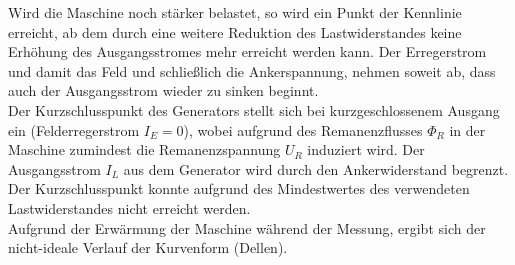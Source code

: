 Wird die Maschine noch stärker belastet, so wird ein Punkt der Kennlinie erreicht, ab dem durch eine weitere Reduktion des Lastwiderstandes keine Erhöhung des Ausgangsstromes mehr erreicht werden kann. Der Erregerstrom und damit das Feld und schließlich die Ankerspannung, nehmen soweit ab, dass auch der Ausgangsstrom wieder zu sinken beginnt.\\
Der Kurzschlusspunkt des Generators stellt sich bei kurzgeschlossenem Ausgang ein (Felderregerstrom $I_E=0$), wobei aufgrund des Remanenzflusses $\Phi_R$ in der Maschine zumindest die Remanenzspannung $U_R$ induziert wird. Der Ausgangsstrom $I_L$ aus dem Generator wird durch den Ankerwiderstand begrenzt.\\
Der Kurzschlusspunkt konnte aufgrund des Mindestwertes des verwendeten Lastwiderstandes nicht erreicht werden.\\
Aufgrund der Erwärmung der Maschine während der Messung, ergibt sich der nicht-ideale Verlauf der Kurvenform (Dellen).

%